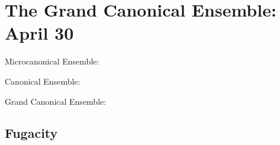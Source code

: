 \section{The Grand Canonical Ensemble: April 30}
Microcanonical Ensemble:

Canonical Ensemble:

Grand Canonical Ensemble:


\subsection{Fugacity}
\label{s:Fugacity}
